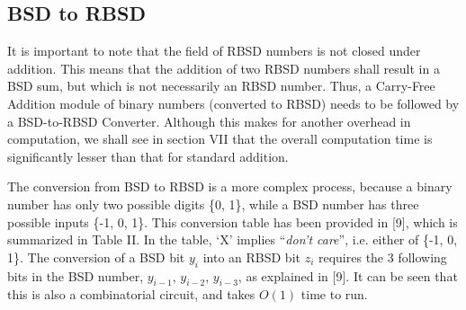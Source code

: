 \documentclass[conference]{IEEEtran}
\begin{document}
\subsection{BSD to RBSD}

It is important to note that the field of RBSD numbers is not closed under addition. This means that the addition of two RBSD numbers shall result in a BSD sum, but which is not necessarily an RBSD number. Thus, a Carry-Free Addition module of binary numbers (converted to RBSD) needs to be followed by a BSD-to-RBSD Converter. Although this makes for another overhead in computation, we shall see in section VII that the overall computation time is significantly lesser than that for standard addition.

The conversion from BSD to RBSD is a more complex process, because a binary number has only two possible digits \{0, 1\}, while a BSD number has three possible inputs \{-1, 0, 1\}. This conversion table has been provided in [9], which is summarized in Table II. In the table, `X' implies ``\textit{don't care}'', i.e. either of \{-1, 0, 1\}. The conversion of a BSD bit $y_{i}$ into an RBSD bit $z_{i}$ requires the 3 following bits in the BSD number, $y_{i-1}$, $y_{i-2}$, $y_{i-3}$, as explained in [9]. It can be seen that this is also a combinatorial circuit, and takes $O(1)$ time to run.
\end{document}
